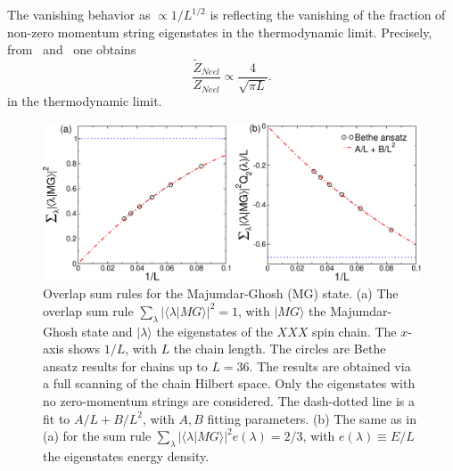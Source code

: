 \documentclass[11pt]{iopart}
\begin{document}
The vanishing behavior as $\propto 1/L^{1/2}$ is reflecting the vanishing 
of the fraction of non-zero momentum string eigenstates in the thermodynamic limit.  
Precisely, from~ and~ one obtains 
%
\begin{equation}
\label{beh}
\frac{\widetilde Z_{Neel}}{Z_{Neel}}\propto\frac{4}{\sqrt{\pi L}}. 
\end{equation}
% 
in the thermodynamic limit. 

\begin{figure}[t]
\begin{center}
\includegraphics[width=.9\textwidth]{./draft_figs/Dimer}
\end{center}
\caption{ Overlap sum rules for the Majumdar-Ghosh (MG) state. (a) The 
 overlap sum rule $\sum_{\lambda}|\langle\lambda|MG\rangle|^2=1$, 
 with $|MG\rangle$ the Majumdar-Ghosh state and $|\lambda\rangle$ 
 the eigenstates  of the $XXX$ spin chain. The $x$-axis shows $1/L$, 
 with $L$ the chain length. The circles are Bethe ansatz results for 
 chains up to $L=36$. The results are obtained via a full scanning of 
 the chain Hilbert space. Only the eigenstates with no zero-momentum 
 strings are considered. The dash-dotted line is a fit to $A/L+B/L^2$, 
 with $A,B$ fitting parameters. (b) The same as in (a) for the sum 
 rule $\sum_{\lambda}|\langle\lambda|MG\rangle|^2e(\lambda)=
 2/3$, with $e(\lambda)\equiv E/L$  the eigenstates energy density. 
}
\label{fig2:dimer-sr}
\end{figure}
\end{document}
